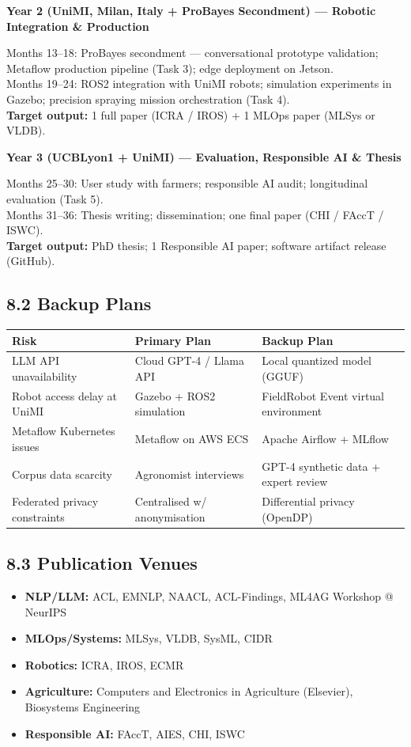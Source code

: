 \documentclass[11pt,a4paper]{article}
\begin{document}
\textbf{Year 2 (UniMI, Milan, Italy + ProBayes Secondment) — Robotic Integration \& Production}

\noindent Months 13--18: ProBayes secondment — conversational prototype validation;
Metaflow production pipeline (Task 3); edge deployment on Jetson.\\
Months 19--24: ROS2 integration with UniMI robots; simulation experiments in Gazebo;
precision spraying mission orchestration (Task 4).\\
\textbf{Target output:} 1 full paper (ICRA / IROS) + 1 MLOps paper (MLSys or VLDB).

\textbf{Year 3 (UCBLyon1 + UniMI) — Evaluation, Responsible AI \& Thesis}

\noindent Months 25--30: User study with farmers; responsible AI audit; longitudinal evaluation (Task 5).\\
Months 31--36: Thesis writing; dissemination; one final paper (CHI / FAccT / ISWC).\\
\textbf{Target output:} PhD thesis; 1 Responsible AI paper; software artifact release (GitHub).

\subsection{8.2 Backup Plans}

\begin{tabularx}{\textwidth}{@{}lXX@{}}
  \toprule
  \textbf{Risk} & \textbf{Primary Plan} & \textbf{Backup Plan} \\
  \midrule
  LLM API unavailability & Cloud GPT-4 / Llama API & Local quantized model (GGUF) \\
  Robot access delay at UniMI & Gazebo + ROS2 simulation & FieldRobot Event virtual environment \\
  Metaflow Kubernetes issues & Metaflow on AWS ECS & Apache Airflow + MLflow \\
  Corpus data scarcity & Agronomist interviews & GPT-4 synthetic data + expert review \\
  Federated privacy constraints & Centralised w/ anonymisation & Differential privacy (OpenDP) \\
  \bottomrule
\end{tabularx}

\subsection{8.3 Publication Venues}

\begin{itemize}[leftmargin=1.2em,itemsep=1pt]
  \item \textbf{NLP/LLM:} ACL, EMNLP, NAACL, ACL-Findings, ML4AG Workshop @ NeurIPS
  \item \textbf{MLOps/Systems:} MLSys, VLDB, SysML, CIDR
  \item \textbf{Robotics:} ICRA, IROS, ECMR
  \item \textbf{Agriculture:} Computers and Electronics in Agriculture (Elsevier), Biosystems Engineering
  \item \textbf{Responsible AI:} FAccT, AIES, CHI, ISWC
\end{itemize}
\end{document}
